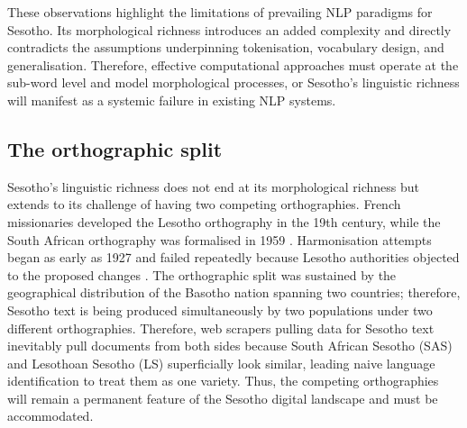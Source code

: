 \documentclass[11pt,a4paper]{article}
\begin{document}
These observations highlight the limitations of prevailing NLP paradigms for Sesotho. Its morphological richness introduces an added complexity and directly contradicts the assumptions underpinning tokenisation, vocabulary design, and generalisation. Therefore, effective computational approaches must operate at the sub-word level and model morphological processes, or Sesotho's linguistic richness will manifest as a systemic failure in existing NLP systems.

\subsection{The orthographic split}
Sesotho's linguistic richness does not end at its morphological richness but extends to its challenge of having two competing orthographies. French missionaries developed the Lesotho orthography in the 19th century, while the South African orthography was formalised in 1959 \citep{makutoane2022people}. Harmonisation attempts began as early as 1927 and failed repeatedly because Lesotho authorities objected to the proposed changes \citep{matlosa2017sesotho}. The orthographic split was sustained by the geographical distribution of the Basotho nation spanning two countries; therefore, Sesotho text is being produced simultaneously by two populations under two different orthographies. Therefore, web scrapers pulling data for Sesotho text inevitably pull documents from both sides because South African Sesotho (SAS) and Lesothoan Sesotho (LS) superficially look similar, leading naive language identification to treat them as one variety. Thus, the competing orthographies will remain a permanent feature of the Sesotho digital landscape and must be accommodated. 
\end{document}

